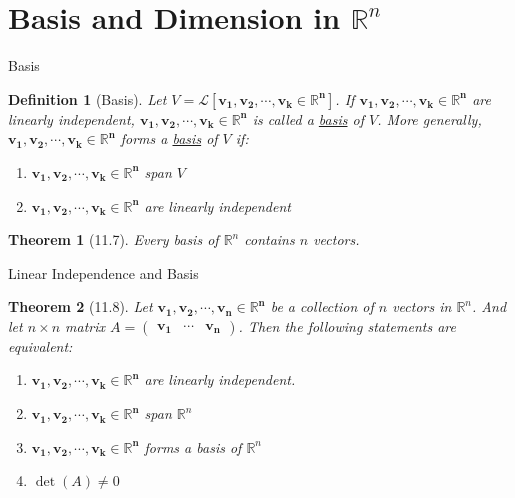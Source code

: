 \documentclass[a4paper,11pt]{article}
\newtheorem{defn}{Definition}
\newtheorem{thm}{Theorem}
\begin{document}

\section{Basis and Dimension in $\mathbb{R}^n$} %
\label{sec:basis_and_dimension_in_mathbb_r_n}
\begin{frame}[t]{Basis}
	\begin{defn}
		[Basis] Let $V=\mathcal{L}[\mathbf{v_1,v_2,\cdots,v_k\in\mathbb{R}^n}]$. If $\mathbf{v_1,v_2,\cdots,v_k\in\mathbb{R}^n}$ are linearly independent, $\mathbf{v_1,v_2,\cdots,v_k\in\mathbb{R}^n}$ is called a \uline{basis} of $V$. More generally,  $\mathbf{v_1,v_2,\cdots,v_k\in\mathbb{R}^n}$ forms a \uline{basis} of $V$ if:
		\begin{enumerate}
			\item $\mathbf{v_1,v_2,\cdots,v_k\in\mathbb{R}^n}$ span $V$
			\item $\mathbf{v_1,v_2,\cdots,v_k\in\mathbb{R}^n}$ are linearly independent
		\end{enumerate}
	\end{defn}
	\begin{thm}
		[11.7] Every basis of $\mathbb{R}^n$ contains $n$ vectors.
	\end{thm}
\end{frame}

\begin{frame}[t]{Linear Independence and Basis}
	\begin{thm}
		[11.8] Let $\mathbf{v_1,v_2,\cdots,v_n\in\mathbb{R}^n}$ be a collection of $n$ vectors in $\mathbb{R}^n$. And let $n\times n$ matrix $A = \begin{pmatrix}
			\mathbf{v_1}&\cdots&\mathbf{v_n}
		\end{pmatrix}$. Then the following statements are equivalent:
		\begin{enumerate}
			\item $\mathbf{v_1,v_2,\cdots,v_k\in\mathbb{R}^n}$ are linearly independent.
			\item $\mathbf{v_1,v_2,\cdots,v_k\in\mathbb{R}^n}$ span $\mathbb{R}^n$
			\item $\mathbf{v_1,v_2,\cdots,v_k\in\mathbb{R}^n}$ forms a basis of $\mathbb{R}^n$
			\item $\det(A)\neq 0$
		\end{enumerate}
	\end{thm}
\end{frame}
\end{document}
